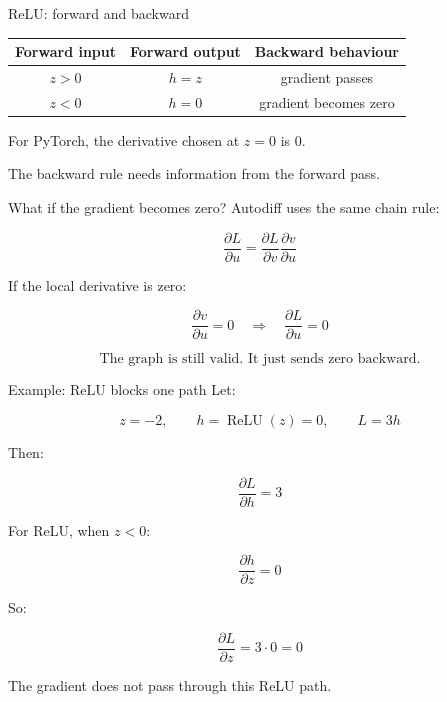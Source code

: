 \documentclass[10pt,aspectratio=169]{beamer}
\newcommand{\grad}[2]{\frac{\partial #1}{\partial #2}}
\begin{document}
\begin{frame}[t]{ReLU: forward and backward}
\centering
\small

\begin{tabular}{c c c}
\toprule
Forward input & Forward output & Backward behaviour \\
\midrule
\(z>0\) & \(h=z\) & gradient passes \\
\(z<0\) & \(h=0\) & gradient becomes zero \\
\bottomrule
\end{tabular}

\vspace{0.5cm}

For PyTorch, the derivative chosen at \(z=0\) is \(0\).

\vfill

The backward rule needs information from the forward pass.
\end{frame}



\begin{frame}[t]{What if the gradient becomes zero?}
Autodiff uses the same chain rule:

\[
\grad{L}{u}=\grad{L}{v}\grad{v}{u}
\]

If the local derivative is zero:

\[
\grad{v}{u}=0
\quad\Rightarrow\quad
\grad{L}{u}=0
\]

\vfill

\[
\boxed{
\text{The graph is still valid. It just sends zero backward.}
}
\]
\end{frame}

\begin{frame}[t]{Example: ReLU blocks one path}
Let:

\[
z=-2,\qquad h=\operatorname{ReLU}(z)=0,\qquad L=3h
\]

Then:

\[
\grad{L}{h}=3
\]

For ReLU, when \(z<0\):

\[
\grad{h}{z}=0
\]

So:

\[
\grad{L}{z}=3\cdot 0=0
\]

\vfill

The gradient does not pass through this ReLU path.
\end{frame}
\end{document}
